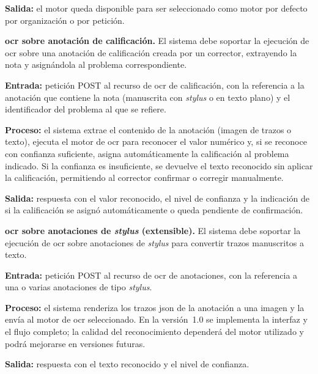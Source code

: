\begin{functional}
    \textbf{Salida:} el motor queda disponible para ser seleccionado como motor por defecto
    por organización o por petición.

    \item \textbf{\acs{ocr} sobre anotación de calificación.}
    \label{rf:ingestion:ocr_grade}
    El sistema debe soportar la ejecución de \acs{ocr} sobre una anotación de calificación
    creada por un corrector, extrayendo la nota y asignándola al problema correspondiente.

    \textbf{Entrada:} petición POST al recurso de \acs{ocr} de calificación, con la
    referencia a la anotación que contiene la nota (manuscrita con \textit{stylus} o en
    texto plano) y el identificador del problema al que se refiere.

    \textbf{Proceso:} el sistema extrae el contenido de la anotación (imagen de trazos o
    texto), ejecuta el motor de \acs{ocr} para reconocer el valor numérico y, si se
    reconoce con confianza suficiente, asigna automáticamente la calificación al problema
    indicado. Si la confianza es insuficiente, se devuelve el texto reconocido sin aplicar
    la calificación, permitiendo al corrector confirmar o corregir manualmente.

    \textbf{Salida:} respuesta con el valor reconocido, el nivel de confianza y la
    indicación de si la calificación se asignó automáticamente o queda pendiente de
    confirmación.

    \item \textbf{\acs{ocr} sobre anotaciones de \textit{stylus} (extensible).}
    \label{rf:ingestion:ocr_stylus}
    El sistema debe soportar la ejecución de \acs{ocr} sobre anotaciones de \textit{stylus}
    para convertir trazos manuscritos a texto.

    \textbf{Entrada:} petición POST al recurso de \acs{ocr} de anotaciones, con la
    referencia a una o varias anotaciones de tipo \textit{stylus}.

    \textbf{Proceso:} el sistema renderiza los trazos \acs{json} de la anotación a una
    imagen y la envía al motor de \acs{ocr} seleccionado. En la versión~1.0 se implementa
    la interfaz y el flujo completo; la calidad del reconocimiento dependerá del motor
    utilizado y podrá mejorarse en versiones futuras.

    \textbf{Salida:} respuesta con el texto reconocido y el nivel de confianza.

\end{functional}
